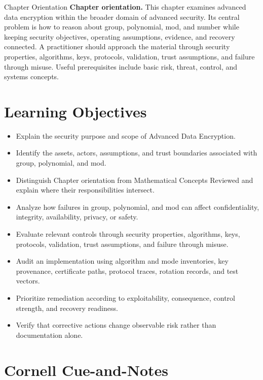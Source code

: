 \documentclass[11pt,letterpaper]{article}
\title{\CornellDocumentTitle}
\author{}
\date{}
\begin{document}
\maketitle
\begin{CornellOverviewBox}{Chapter Orientation}
\textbf{Chapter orientation.} This chapter examines advanced data encryption within the broader domain of advanced security. Its central problem is how to reason about group, polynomial, mod, and number while keeping security objectives, operating assumptions, evidence, and recovery connected. A practitioner should approach the material through security properties, algorithms, keys, protocols, validation, trust assumptions, and failure through misuse. Useful prerequisites include basic risk, threat, control, and systems concepts.
\end{CornellOverviewBox}
\section*{Learning Objectives}
\begin{itemize}
\item Explain the security purpose and scope of Advanced Data Encryption.
\item Identify the assets, actors, assumptions, and trust boundaries associated with group, polynomial, and mod.
\item Distinguish Chapter orientation from Mathematical Concepts Reviewed and explain where their responsibilities intersect.
\item Analyze how failures in group, polynomial, and mod can affect confidentiality, integrity, availability, privacy, or safety.
\item Evaluate relevant controls through security properties, algorithms, keys, protocols, validation, trust assumptions, and failure through misuse.
\item Audit an implementation using algorithm and mode inventories, key provenance, certificate paths, protocol traces, rotation records, and test vectors.
\item Prioritize remediation according to exploitability, consequence, control strength, and recovery readiness.
\item Verify that corrective actions change observable risk rather than documentation alone.
\end{itemize}
\section*{Cornell Cue-and-Notes}
\end{document}
